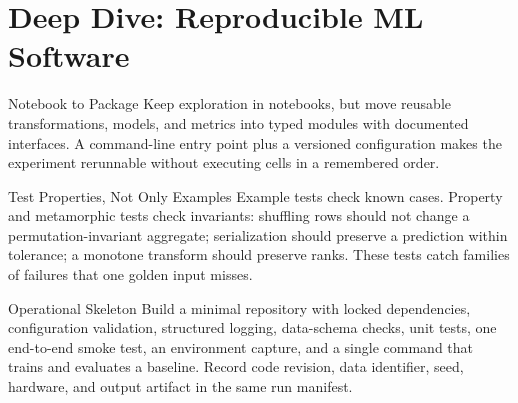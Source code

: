 \section{Deep Dive: Reproducible ML Software}
\begin{v3topic}{Notebook to Package}
Keep exploration in notebooks, but move reusable transformations, models, and
metrics into typed modules with documented interfaces.
A command-line entry point plus a versioned configuration makes the experiment
rerunnable without executing cells in a remembered order.

\end{v3topic}
\begin{v3topic}{Test Properties, Not Only Examples}
Example tests check known cases.
Property and metamorphic tests check invariants: shuffling rows should not
change a permutation-invariant aggregate; serialization should preserve a
prediction within tolerance; a monotone transform should preserve ranks.
These tests catch families of failures that one golden input misses.

\end{v3topic}
\begin{v3topic}{Operational Skeleton}
Build a minimal repository with locked dependencies, configuration validation,
structured logging, data-schema checks, unit tests, one end-to-end smoke test,
an environment capture, and a single command that trains and evaluates a
baseline.
Record code revision, data identifier, seed, hardware, and output artifact in
the same run manifest.
\end{v3topic}


